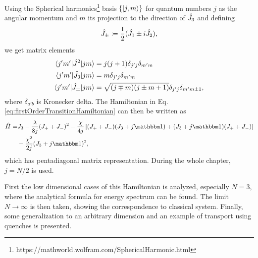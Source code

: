 Using the Spherical harmonics\footnote{https://mathworld.wolfram.com/SphericalHarmonic.html} basis $\{\ket{j,m}\}$ for quantum numbers $j$ as the angular momentum and $m$ its projection to the direction of $\hat{J}_3$ and defining
\begin{equation}
    \hat{J}_\pm\coloneqq\frac{1}{2}(\hat{J}_1\pm i\hat{J}_2),
\end{equation}
we get matrix elements
\begin{align}
    \braket{j'm'|\hat{J}^2|jm} &= j(j+1)\delta_{j'j}\delta_{m'm}\\
    \braket{j'm'|\hat{J}_3|jm} &= m \delta_{j'j}\delta_{m'm}\\
    \braket{j'm'|\hat{J}_\pm|jm} &= \sqrt{(j\mp m)(j\pm m+1)}\delta_{j'j}\delta_{m'm\pm 1},
\end{align}
where $\delta_{a'b}$ is Kronecker delta. The Hamiltonian in Eq. \ref{eq:firstOrderTransitionHamiltonian} can then be written as
\begin{equation}
\begin{split}
        \HH =& J_3-\frac{\lambda}{8j}(J_++J_-)^2-\frac{\chi}{4j}\left[(J_++J_-)(J_3+j\Id)+(J_3+j\Id)(J_++J_-)\right]\\
        &-\frac{\chi^2}{2j}(J_3+j\Id)^2,
\end{split}
\end{equation}
which has pentadiagonal matrix representation. During the whole chapter, $j=N/2$ is used. 

First the low dimensional cases of this Hamiltonian is analyzed, especially $N=3$, where the analytical formula for energy spectrum can be found. The limit $N\rightarrow \infty$ is then taken, showing the correspondence to classical system. Finally, some generalization to an arbitrary dimension and an example of transport using quenches is presented. 











